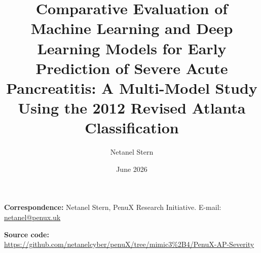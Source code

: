 \documentclass[12pt,a4paper]{article}
\begin{document}
\title{\textbf{Comparative Evaluation of Machine Learning and Deep Learning Models for Early Prediction of Severe Acute Pancreatitis: A Multi-Model Study Using the 2012 Revised Atlanta Classification}}

\author[1]{Netanel Stern}

\date{June 2026}

\maketitle

\noindent\textbf{Correspondence:} Netanel Stern, PenuX Research Initiative. E-mail: \href{mailto:netanel@penux.uk}{netanel@penux.uk}

\vspace{0.5cm}
\noindent\textbf{Source code:} \url{https://github.com/netanelcyber/penuX/tree/mimic3%2B4/PenuX-AP-Severity}

\vspace{0.5cm}
\noindent{}

\clearpage
\end{document}

